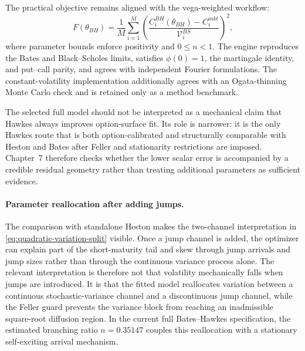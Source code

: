 \documentclass[a4paper,10pt,titlepage,oneside,openany]{book}
\theoremstyle{plain}
\theoremstyle{definition}
\theoremstyle{remark}
\newcommand{\vega}{\mathcal{V}}
\begin{document}
The practical objective remains aligned with the vega-weighted workflow:
\begin{equation}
    F(\theta_{BH})
    =
    \frac{1}{M}\sum_{i=1}^M
    \left(
        \frac{C_i^{BH}(\theta_{BH})-C_i^{mkt}}{\vega_i^{BS}}
    \right)^2,
    \label{eq:bates-hawkes-objective}
\end{equation}
where parameter bounds enforce positivity and \(0\leq n<1\). The engine reproduces the Bates and Black--Scholes limits, satisfies \(\phi(0)=1\), the martingale identity, and put--call parity, and agrees with independent Fourier formulations. The constant-volatility implementation additionally agrees with an Ogata-thinning Monte Carlo check and is retained only as a method benchmark.

The selected full model should not be interpreted as a mechanical claim that Hawkes always improves option-surface fit. Its role is narrower: it is the only Hawkes route that is both option-calibrated and structurally comparable with Heston and Bates after Feller and stationarity restrictions are imposed. Chapter~7 therefore checks whether the lower scalar error is accompanied by a credible residual geometry rather than treating additional parameters as sufficient evidence.

\paragraph{Parameter reallocation after adding jumps.}
The comparison with standalone Heston makes the two-channel interpretation in \eqref{eq:quadratic-variation-split} visible. Once a jump channel is added, the optimizer can explain part of the short-maturity tail and skew through jump arrivals and jump sizes rather than through the continuous variance process alone. The relevant interpretation is therefore not that volatility mechanically falls when jumps are introduced. It is that the fitted model reallocates variation between a continuous stochastic-variance channel and a discontinuous jump channel, while the Feller guard prevents the variance block from reaching an inadmissible square-root diffusion region. In the current full Bates--Hawkes specification, the estimated branching ratio \(n=0.35147\) couples this reallocation with a stationary self-exciting arrival mechanism.
\end{document}
